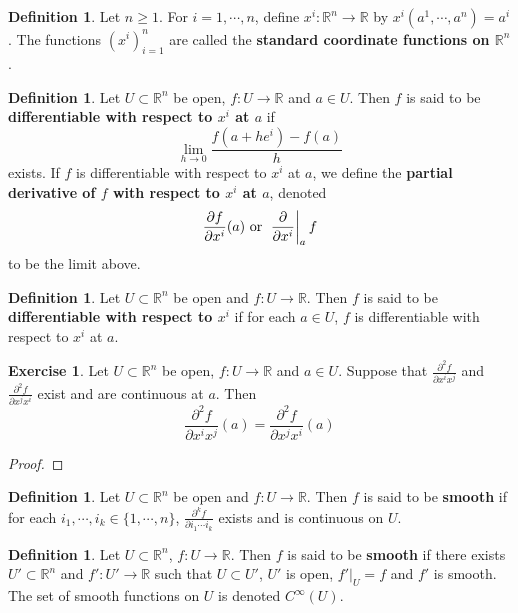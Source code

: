 \documentclass[12pt]{amsart}
\theoremstyle{definition}
\newtheorem{defn}[definition]{Definition}
\newtheorem{ex}[definition]{Exercise}
\newcommand{\R}{\mathbb{R}}
\newcommand{\lex}[1]{\label{ex:#1}}
\newcommand{\ld}[1]{\label{defn:#1}}
\begin{document}
	\begin{defn} \ld{21001}
		Let $n \geq 1$. For $i = 1, \cdots, n$, define $x^i: \R^n \rightarrow \R$ by $x^i(a^1, \cdots, a^n) = a^i$. The functions $(x^i)_{i=1}^n$ are called the \textbf{standard coordinate functions on $\R^n$}. 
	\end{defn}
	
	\begin{defn} \ld{21002}
		Let $U \subset \R^n$ be open, $f: U \rightarrow \R$ and $a \in U$. Then $f$ is said to be \textbf{differentiable with respect to $x^i$ at $a$} if $$\lim\limits_{h \rightarrow 0} \frac{f(a + he^i) - f(a)}{h}$$ exists. If $f$ is differentiable with respect to $x^i$ at $a$, we define the \textbf{partial derivative of $f$ with respect to $x^i$ at $a$}, denoted $$\frac{\partial f}{\partial x^i} (a) \text{ or } \eval{\pdv{x^i}}_{a} f $$ to be the limit above.
		
	\end{defn}
		
	\begin{defn} \ld{21003}
		Let $U \subset \R^n$ be open and $f: U \rightarrow \R$. Then $f$ is said to be \textbf{differentiable with respect to $x^i$} if for each $a \in U$, $f$ is differentiable with respect to $x^i$ at $a$.
	\end{defn}

	\begin{ex}\lex{21004}
		Let $U \subset \R^n$ be open, $f: U \rightarrow \R$ and $a \in U$. Suppose that $\frac{\partial ^2 f}{\partial x^i x^j}$ and $\frac{\partial ^2 f}{\partial x^j x^i}$ exist and are continuous at $a$. Then $$\frac{\partial ^2 f}{\partial x^i x^j} (a) = \frac{\partial ^2 f}{\partial x^j x^i} (a)$$
	\end{ex}

	\begin{proof}
		
	\end{proof}

	\begin{defn} \ld{21004}
		Let $U \subset \R^n$ be open and $f: U \rightarrow \R$. Then $f$ is said to be \textbf{smooth} if for each $i_1, \cdots, i_k \in \{1, \cdots, n\}$, $\frac{\partial^k f}{\partial i_1 \cdots i_k}$ exists and is continuous on $U$.
	\end{defn}

	\begin{defn} \ld{21005}
		Let $U \subset \R^n$, $f: U \rightarrow \R$. Then $f$ is said to be \textbf{smooth} if there exists $U' 
		\subset \R^n$ and $f':U' \rightarrow \R$ such that $U \subset U'$, $U'$ is open, $f'|_U = f$ and $f'$ is smooth. The set of smooth functions on $U$ is denoted $C^{\infty}(U)$.
	\end{defn}
\end{document}

